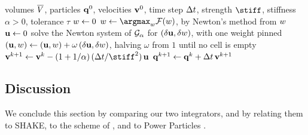 \documentclass[main.tex]{subfiles}
\begin{document}
\begin{algorithm}[t]
  \caption{Penalty-based integrator (\S\ref{sec:flow-penalty}).}
  \label{alg:flow-penalty}
  \begin{algorithmic}[1]
    \Require volumes $\overline{V}$, particles $\mathbf{q}^0$, velocities $\mathbf{v}^0$, time step $\Delta t$, strength $\stiff$, stiffness $\alpha \!>\! 0$, tolerance $\tau$
    \State $w \gets 0$
      \State $\weight \gets \argmax_\weight \dualenergy(\weight)$, by Newton's method from $w$
      \State $\mathbf{u} \gets 0$
      \Repeat
        \State solve the Newton system of $\mathcal{G}_\alpha$ for $(\delta\mathbf{u}, \delta w)$, with one weight pinned
        \State $(\mathbf{u}, w) \gets (\mathbf{u}, w) + \omega\,(\delta\mathbf{u}, \delta w)$, halving $\omega$ from $1$ until no cell is empty
      \Until{$\norm{(\delta\shift, \delta\weight)} < \tau$}
      \State $\vel^{k+1} \gets \vel^k - (1 + 1/\alpha)\,(\tstep/\stiff^2)\, \shift$
      \State $\mathbf{q}^{k+1} \gets \mathbf{q}^k + \Delta t\,\mathbf{v}^{k+1}$
    \EndFor
  \end{algorithmic}
\end{algorithm}

\subsection{Discussion}
\label{sec:flow-discussion}

We conclude this section by comparing our two integrators, and by relating them to SHAKE, to the scheme of \citet{Gallouet2018Lagrangian}, and to Power Particles \cite{deGoes2015PowerParticles}.
\end{document}
